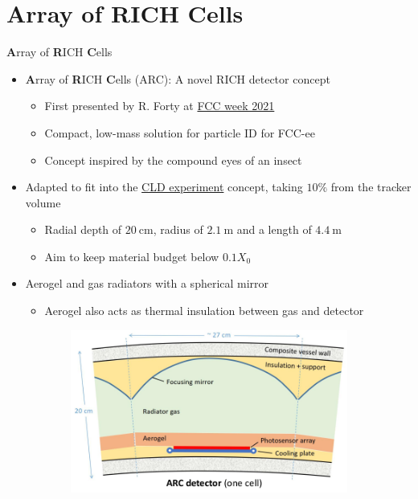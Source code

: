 \documentclass{beamer}
\begin{document}
\section{\textbf{A}rray of \textbf{R}ICH \textbf{C}ells}
\begin{frame}{\textbf{A}rray of \textbf{R}ICH \textbf{C}ells}
  \begin{itemize}
    \setlength\itemsep{0.2em}
    \item{\textbf{A}rray of \textbf{R}ICH \textbf{C}ells (ARC): A novel RICH detector concept}
    \begin{itemize}
      \item{First presented by R. Forty at \href{https://indico.cern.ch/event/995850/contributions/4406336/attachments/2274813/3864163/ARC-presentation.pdf}{FCC week 2021}}
      \item{Compact, low-mass solution for particle ID for FCC-ee}
      \item{Concept inspired by the compound eyes of an insect}
    \end{itemize}
    \item{Adapted to fit into the \href{https://arxiv.org/abs/1911.12230}{CLD experiment} concept, taking $10\%$ from the tracker volume}
    \begin{itemize}
      \item{Radial depth of $\SI{20}{\centi\meter}$, radius of $\SI{2.1}{\meter}$ and a length of $\SI{4.4}{\meter}$}
      \item{Aim to keep material budget below $0.1X_0$}
    \end{itemize}
    \item{Aerogel and gas radiators with a spherical mirror}
    \begin{itemize}
      \item{Aerogel also acts as thermal insulation between gas and detector}
    \end{itemize}
  \end{itemize}
  \begin{figure}
    \centering
    \begin{subfigure}{0.4\textwidth}
      \includegraphics[width = 1.0\textwidth]{Plots/ARC_Cell.png}

\end{subfigure}
\end{figure}
\end{frame}
\end{document}
